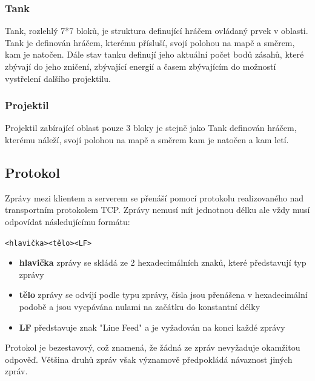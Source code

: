 \documentclass[12pt,a4paper]{article}
\begin{document}
\subsubsection*{Tank}
Tank, rozlehlý 7*7 bloků, je struktura definující hráčem ovládaný prvek v oblasti. Tank je definován hráčem, kterému přísluší, svojí polohou na mapě a směrem, kam je natočen. Dále stav tanku definují jeho aktuální počet bodů zásahů, které zbývají do jeho zničení, zbývající energií a časem zbývajícím do možností vystřelení dalšího projektilu.
\subsubsection*{Projektil}
Projektil zabírající oblast pouze 3 bloky je stejně jako Tank definován hráčem, kterému náleží, svojí polohou na mapě a směrem kam je natočen a kam letí.




\subsection{Protokol}
Zprávy mezi klientem a serverem se přenáší pomocí protokolu realizovaného nad transportním protokolem TCP. Zprávy nemusí mít jednotnou délku ale vždy musí odpovídat následujícímu formátu:
\begin{center}
\texttt{<hlavička><tělo><LF>}
\end{center}
\begin{itemize}
\setlength\itemsep{0em}
\item \textbf{hlavička} zprávy se skládá ze 2 hexadecimálních znaků, které představují typ zprávy
\item \textbf{tělo} zprávy se odvíjí podle typu zprávy, čísla jsou přenášena v hexadecimální podobě a jsou vycpávána nulami na začátku do konstantní délky
\item \textbf{LF} představuje znak "Line Feed" a je vyžadován na konci každé zprávy
\end{itemize}

Protokol je bezestavový, což znamená, že žádná ze zpráv nevyžaduje okamžitou odpověď. Většina druhů zpráv však významově předpokládá návaznost jiných zpráv.
\end{document}
